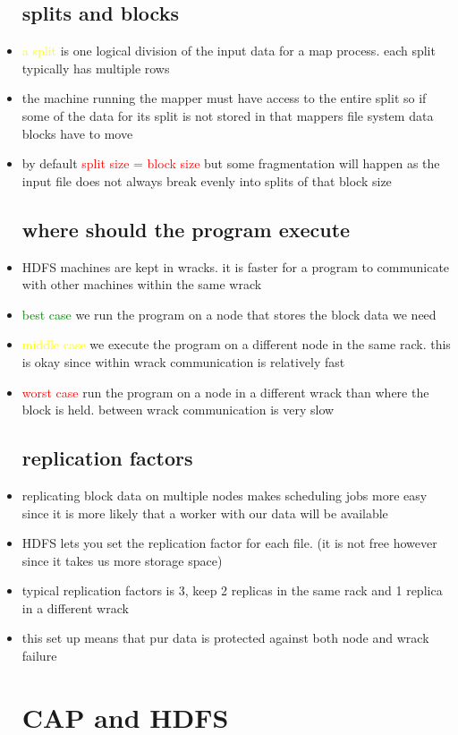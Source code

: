 \documentclass{article}
\begin{document}
\begin{itemize}
\subsection*{splits and blocks}
\item \textcolor{yellow}{a split } is one logical division of the input data  for a map process. each split typically has multiple rows
\item the machine running the mapper must have access to the entire split so if some of the data for its split is not stored in that mappers file system data blocks have to move 
\item by default \textcolor{red}{split size = block size} but some fragmentation will happen as the input file does not always break evenly into splits of that block size
\subsection*{where should the program execute}
\item HDFS machines are kept in wracks. it is faster for a program to communicate with other machines within the same wrack
\item \textcolor{green}{best case} we run the program on a node that stores the block data we need 
\item \textcolor{yellow}{middle case}  we execute the program on a different node in the same rack. this is okay since within wrack communication is relatively fast
\item \textcolor{red}{worst case} run the program on a node in a different wrack than where the block is held. between wrack communication is very slow
\subsection*{replication factors}
\item replicating block data on multiple nodes makes scheduling jobs more easy since it is more likely that a worker with our data will be available 
\item HDFS lets you set the replication factor for each file. (it is not free however since it takes us more storage space)
\item typical replication factors is 3, keep 2 replicas in the same rack and 1 replica in a different wrack 
\item this set up means that pur data is protected against both node and wrack failure 
\section*{CAP and HDFS}

\end{itemize}
\end{document}
